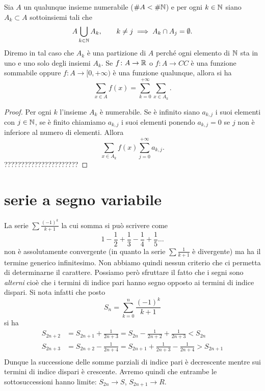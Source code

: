 \begin{theorem}
Sia $A$ un qualunque insieme numerabile ($\#A<\#{\mathbb N}$)
e per ogni $k\in {\mathbb N}$ siano $A_k\subset A$ sottoinsiemi tali 
che 
\[
 A \bigcup_{k\in {\mathbb N}} A_k, \qquad 
 k\neq j \implies A_k \cap A_j = \emptyset.
\]
Diremo in tal caso che $A_k$ è una partizione di $A$ 
perché ogni elemento di ${\mathbb N}$ sta in uno e uno solo 
degli insiemi $A_k$.
Se $f\colon A\to {\mathbb R}$ o $f\colon A\to CC$ è una funzione 
sommabile oppure $f\colon A \to [0,+\infty)$ 
è una funzione qualunque, allora si ha 
\[
  \sum_{x\in A} f(x) = \sum_{k=0}^{+\infty} \sum_{x\in A_k}.  
\]
\end{theorem}
%
\begin{proof}
Per ogni $k$ l'insieme $A_k$ è numerabile. 
Se è infinito siano $a_{k,j}$ i suoi elementi con $j\in {\mathbb N}$,  
se è finito chiamiamo $a_{k,j}$ i suoi elementi 
ponendo $a_{k,j}=0$ se $j$ non è inferiore al numero di elementi.
Allora 
\[
 \sum_{x\in A_k} f(x)\sum_{j=0}^{+\infty} a_{k,j}.
\]
??????????????????????
\end{proof}

\section{serie a segno variabile}

La serie $\sum \frac{(-1)^k}{k+1}$ la cui somma si può scrivere come
%
\[
1 - \frac{1}{2} + \frac{1}{3} - \frac{1}{4} +  \frac{1}{5} \dots
\]
non è assolutamente convergente
(in quanto la serie $\sum \frac 1 {k+1}$ è divergente) ma ha il termine generico
infinitesimo. Non abbiamo quindi nessun criterio che ci permetta di
determinarne il carattere.
Possiamo però sfruttare il fatto che i segni sono \emph{alterni} cioè
che i termini di indice pari hanno segno opposto ai termini di indice dispari. Si nota infatti che posto
\[
  S_n = \sum_{k=0}^n \frac{(-1)^k}{k+1}
\]
si ha
\begin{align*}
S_{2n+2}
  &= S_{2n+1} + \frac{1}{2n+3}
  = S_{2n} - \frac{1}{2n+2} + \frac{1}{2n+3}
  < S_{2n}\\
S_{2n+3}
  &= S_{2n+2} - \frac{1}{2n+4}
  = S_{2n+1} + \frac{1}{2n+3} - \frac{1}{2n+4}
  > S_{2n+1} \\
\end{align*}
Dunque la successione delle somme parziali di indice pari è decrescente mentre
sui termini di indice dispari è crescente. Avremo quindi che entrambe
le sottosuccessioni hanno limite: $S_{2n} \to S$, $S_{2n+1} \to R$.

